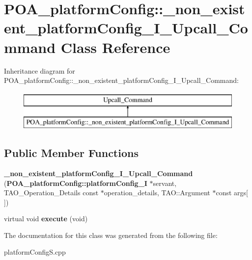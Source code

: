\section{P\+O\+A\+\_\+platform\+Config\+:\+:\+\_\+non\+\_\+existent\+\_\+platform\+Config\+\_\+\+I\+\_\+\+Upcall\+\_\+\+Command Class Reference}
\label{classPOA__platformConfig_1_1__non__existent__platformConfig__I__Upcall__Command}
Inheritance diagram for P\+O\+A\+\_\+platform\+Config\+:\+:\+\_\+non\+\_\+existent\+\_\+platform\+Config\+\_\+\+I\+\_\+\+Upcall\+\_\+\+Command\+:\begin{figure}[H]
\begin{center}
\leavevmode
\includegraphics[height=2.000000cm]{classPOA__platformConfig_1_1__non__existent__platformConfig__I__Upcall__Command}
\end{center}
\end{figure}
\subsection*{Public Member Functions}
\begin{DoxyCompactItemize}
\item 
{\bfseries \+\_\+non\+\_\+existent\+\_\+platform\+Config\+\_\+\+I\+\_\+\+Upcall\+\_\+\+Command} ({\bf P\+O\+A\+\_\+platform\+Config\+::platform\+Config\+\_\+I} $\ast$servant, T\+A\+O\+\_\+\+Operation\+\_\+\+Details const $\ast$operation\+\_\+details, T\+A\+O\+::\+Argument $\ast$const args[$\,$])\label{classPOA__platformConfig_1_1__non__existent__platformConfig__I__Upcall__Command_a32d389e646bf629344987342ad85c763}

\item 
virtual void {\bfseries execute} (void)\label{classPOA__platformConfig_1_1__non__existent__platformConfig__I__Upcall__Command_a30061d5f7ee9157ffe2cfca1d4db0858}

\end{DoxyCompactItemize}


The documentation for this class was generated from the following file\+:\begin{DoxyCompactItemize}
\item 
platform\+Config\+S.\+cpp\end{DoxyCompactItemize}
